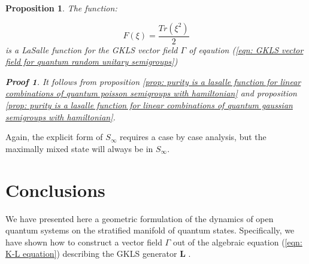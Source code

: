 \documentclass[11pt]{article}
\newcommand{\be}{\begin{equation}}
\newcommand{\ee}{\end{equation}}
\newtheorem{prop}{Proposition}
\newtheorem*{pf}{Proof}
\begin{document}
\begin{prop}\label{prop: purity is a lasalle function for quantum random unitary semigroups}
The function:

\be
F(\xi)=\frac{Tr\left(\xi^{2}\right)}{2}
\ee
is a LaSalle function for the GKLS vector field $\Gamma$   of eqaution (\ref{eqn: GKLS vector field for quantum random unitary semigroups})
\begin{pf}
It follows from proposition \ref{prop: purity is a lasalle function for linear combinations of quantum poisson semigroups with hamiltonian} and proposition \ref{prop: purity is a lasalle function for linear combinations of quantum gaussian semigroups with hamiltonian}.
\end{pf}
\end{prop}

Again, the explicit form of $S_{\infty}$ requires a case by case analysis, but the maximally mixed state will always be in $S_{\infty}$.



\section{Conclusions}\label{sec: Conclusions}

We have presented here a geometric formulation of the dynamics of open quantum systems on the stratified manifold of quantum states.
Specifically, we have shown how to construct a vector field $\Gamma$ out of the algebraic equation  (\ref{eqn: K-L equation}) describing the GKLS generator $\mathbf{L}$ \cite{gorini_kossakowski_sudarshan-completely_positive_dynamical_semigroups_of_N-level_systems,lindblad-on_the_generators_of_quantum_dynamical_semigroups}.
 
\end{document}
